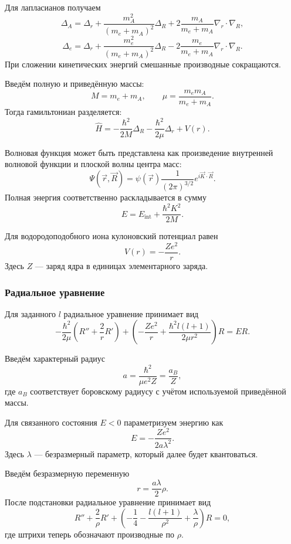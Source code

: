 \documentclass[12pt,a4paper]{article}
\begin{document}
Для лапласианов получаем
\[
    \Delta_A
    =
    \Delta_r
    +
    \frac{m_A^2}{(m_e+m_A)^2}\Delta_R
    +
    2\frac{m_A}{m_e+m_A}
    \nabla_r\!\cdot\nabla_R,
\]
\[
    \Delta_e
    =
    \Delta_r
    +
    \frac{m_e^2}{(m_e+m_A)^2}\Delta_R
    -
    2\frac{m_e}{m_e+m_A}
    \nabla_r\!\cdot\nabla_R.
\]
При сложении кинетических энергий смешанные производные сокращаются.

Введём полную и приведённую массы:
\[
    \boxed{
        M=m_e+m_A,
        \qquad
        \mu=
        \frac{m_em_A}{m_e+m_A}
    }.
\]
Тогда гамильтониан разделяется:
\[
    \boxed{
    \hat H
    =
    -\frac{\hbar^2}{2M}\Delta_R
    -
    \frac{\hbar^2}{2\mu}\Delta_r
    +
    V(r)
    }.
\]

Волновая функция может быть представлена как произведение внутренней
волновой функции и плоской волны центра масс:
\[
    \boxed{
    \Psi(\vec r,\vec R)
    =
    \psi(\vec r)
    \frac{1}{(2\pi)^{3/2}}
    e^{i\vec K\cdot\vec R}
    }.
\]
Полная энергия соответственно раскладывается в сумму
\[
    \boxed{
        E
        =
        E_{\mathrm{int}}
        +
        \frac{\hbar^2K^2}{2M}
    }.
\]

Для водородоподобного иона кулоновский потенциал равен
\[
    \boxed{
        V(r)=-\frac{Ze^2}{r}
    }.
\]
Здесь $Z$ --- заряд ядра в единицах элементарного заряда.

\subsubsection{Радиальное уравнение}

Для заданного $l$ радиальное уравнение принимает вид
\[
    \boxed{
    -\frac{\hbar^2}{2\mu}
    \left(
        R''+\frac{2}{r}R'
    \right)
    +
    \left(
        -\frac{Ze^2}{r}
        +
        \frac{\hbar^2l(l+1)}{2\mu r^2}
    \right)R
    =
    ER
    }.
\]

Введём характерный радиус
\[
    \boxed{
        a
        =
        \frac{\hbar^2}{\mu e^2Z}
        =
        \frac{a_B}{Z}
    },
\]
где $a_B$ соответствует боровскому радиусу с учётом используемой
приведённой массы.

Для связанного состояния $E<0$ параметризуем энергию как
\[
    \boxed{
        E
        =
        -\frac{Ze^2}{2a\lambda^2}
    }.
\]
Здесь $\lambda$ --- безразмерный параметр, который далее будет
квантоваться.

Введём безразмерную переменную
\[
    \boxed{
        r=\frac{a\lambda}{2}\rho
    }.
\]
После подстановки радиальное уравнение принимает вид
\[
    \boxed{
    R''+
    \frac{2}{\rho}R'
    +
    \left(
        -\frac14
        -\frac{l(l+1)}{\rho^2}
        +\frac{\lambda}{\rho}
    \right)R
    =
    0
    },
\]
где штрихи теперь обозначают производные по $\rho$.
\end{document}
